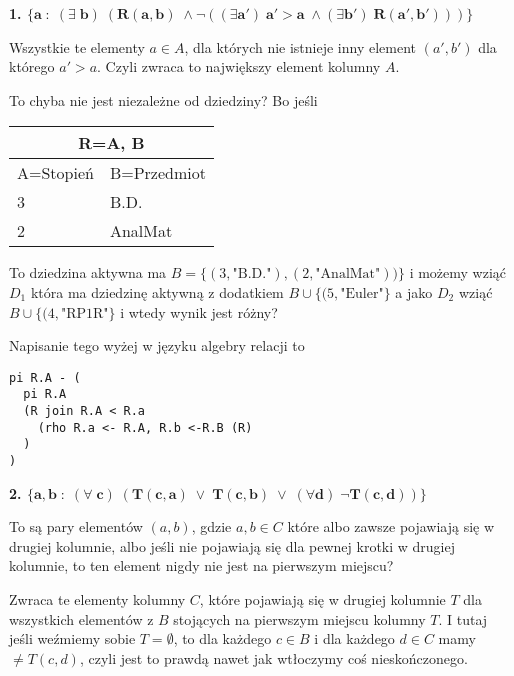 \documentclass{article}
\begin{document}
\begin{solution}
  \textbf{\color{green}1. $\boldsymbol{\{a\;:\;(\exists\;b)\;(R(a, b)\;\land \neg ((\exists a')\;a'>a\;\land (\exists b')\;R(a', b')))\}}$}

  Wszystkie te elementy $a\in A$, dla których nie istnieje inny element $(a', b')$ dla którego $a'>a$. Czyli zwraca to największy element kolumny $A$.

  To chyba nie jest niezależne od dziedziny? Bo jeśli
  \begin{center}
    \begin{tabular}{ | m{} | m{} | }
      \hline 
      \multicolumn{2}{|c|}{R=A, B}\\ 
      \hline 
      A=Stopień & B=Przedmiot\\ 
      \hline 
      3 & B.D.\\ 
      \hline
      2 & AnalMat\\ 
      \hline
    \end{tabular}
  \end{center}
  To dziedzina aktywna ma $B=\{(3, \text{"B.D."}), (2, \text{"AnalMat"}))\}$ i możemy wziąć $D_1$ która ma dziedzinę aktywną z dodatkiem $B\cup \{(5, \text{"Euler"}\}$ a jako $D_2$ wziąć $B\cup \{(4, \text{"RP1R"}\}$ i wtedy wynik jest różny?

  Napisanie tego wyżej w języku algebry relacji to
  \begin{lstlisting}
pi R.A - (
  pi R.A 
  (R join R.A < R.a 
    (rho R.a <- R.A, R.b <-R.B (R)
  )
)
  \end{lstlisting}


  \textbf{\color{green}2. $\boldsymbol{\{a, b\;:\;(\forall\;c)\;(T(c, a)\;\lor\;T(c, b)\;\lor\;(\forall d)\;\neg T(c, d))\}}$}

  To są pary elementów $(a, b)$, gdzie $a,b\in C$ które albo zawsze pojawiają się w drugiej kolumnie, albo jeśli nie pojawiają się dla pewnej krotki w drugiej kolumnie, to ten element nigdy nie jest na pierwszym miejscu?

  Zwraca te elementy kolumny $C$, które pojawiają się w drugiej kolumnie $T$ dla wszystkich elementów z $B$ stojących na pierwszym miejscu kolumny $T$. I tutaj jeśli weźmiemy sobie $T=\emptyset$, to dla każdego $c\in B$ i dla każdego $d\in C$ mamy $\neq T(c, d)$, czyli jest to prawdą nawet jak wtłoczymy coś nieskończonego.
\end{solution}
\end{document}
